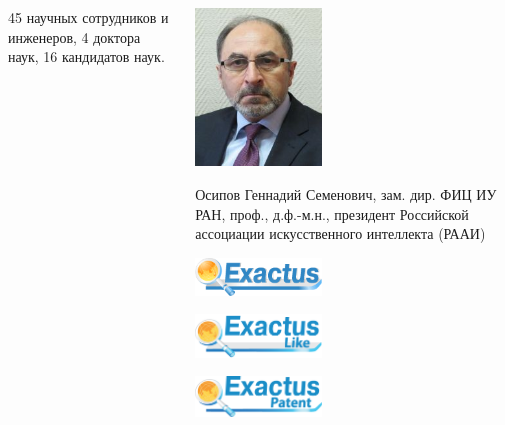 \documentclass[default]{beamer}
\begin{document}
\begin{frame}
\begin{columns}
\begin{column}{0.7\textwidth}
			45 научных сотрудников и инженеров, 4 доктора наук, 16 кандидатов наук.
		\end{column}
		\begin{column}{0.3\textwidth}
			\centering
			\includegraphics[width=0.4\textwidth]{misc/photos/gs}
			\par\smallskip
			\tiny
			Осипов Геннадий Семенович, зам. дир. ФИЦ ИУ РАН, проф., д.ф.-м.н., президент Российской ассоциации искусственного интеллекта (РААИ)
			\par\medskip
			\includegraphics[width=0.4\textwidth]{misc/logos/exactus_logo.png}
			\par\medskip
			\includegraphics[width=0.4\textwidth]{misc/logos/logo_like.png}
			\par\medskip
			\includegraphics[width=0.4\textwidth]{misc/logos/logo_patent.png}
			
		\end{column}
		\end{columns}
	\end{frame}
		
\end{document}
